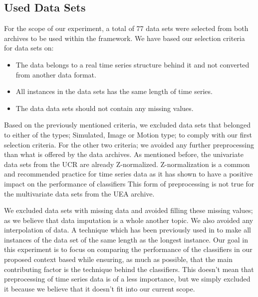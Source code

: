 \subsection{Used Data Sets}
\label{used data sets}
For the scope of our experiment, a total of 77 data sets were selected from both archives to be used within the framework.
We have based our selection criteria for data sets on:
\begin{itemize}
    \item The data belongs to a real time series structure behind it and not converted from another data format.
    \item All instances in the data sets has the same length of time series.
    \item The data data sets should not contain any missing values.
\end{itemize}
Based on the previously mentioned criteria, we excluded data sets that belonged to either of the types; Simulated, Image or Motion type; to comply with our first selection criteria.
For the other two criteria; we avoided any further preprocessing than what is offered by the data archives.
As mentioned before, the univariate data sets from the UCR are already Z-normalized.
Z-normalization is a common and recommended practice for time series data as it has shown to have a positive impact on the performance of classifiers \cite{bagnall2017great,fawaz2019deepreview}
This form of preprocessing is not true for the multivariate data sets from the UEA archive.

We excluded data sets with missing data and avoided filling these missing values; as we believe that data imputation is a whole another topic.
We also avoided any interpolation of data. A technique which has been previously used in \cite{ratanamahatana2005three, fawaz2019deepreview} to make all instances of the data set of the same length as the longest instance.
Our goal in this experiment is to focus on comparing the performance of the classifiers in our proposed context based while ensuring, as much as possible, that the main contributing factor is the technique behind the classifiers.
This doesn't mean that preprocessing of time series data is of a less importance, but we simply excluded it because we believe that it doesn't fit into our current scope.


